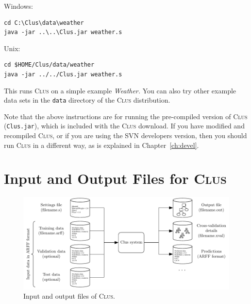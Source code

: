 \documentclass[a4paper]{report}
\newcommand{\clus}{\textsc{Clus}}
\begin{document}
\begin{list}{}{\leftmargin=1.5cm}
\item[Windows:]\mbox{}
\begin{verbatim}
cd C:\Clus\data\weather
java -jar ..\..\Clus.jar weather.s
\end{verbatim}

\item[Unix:]\mbox{}
\begin{verbatim}
cd $HOME/Clus/data/weather
java -jar ../../Clus.jar weather.s
\end{verbatim}
\end{list}

\noindent{}This runs \clus{} on a simple example \emph{Weather.} You can also try other example data sets in the \texttt{data} directory of the \clus{} distribution.

Note that the above instructions are for running the pre-compiled version of \clus{} (\texttt{Clus.jar}), which is included with the \clus{} download. If you have modified and recompiled \clus{}, or if you are using the SVN developers version, then you should run \clus{} in a different way, as is explained in Chapter~\ref{ch:devel}.

%
\section{Input and Output Files for \clus}

\begin{figure}%
\includegraphics{fig/clusinout}
\caption{\label{fig:iofiles}Input and output files of \clus.}
\end{figure}
\end{document}
